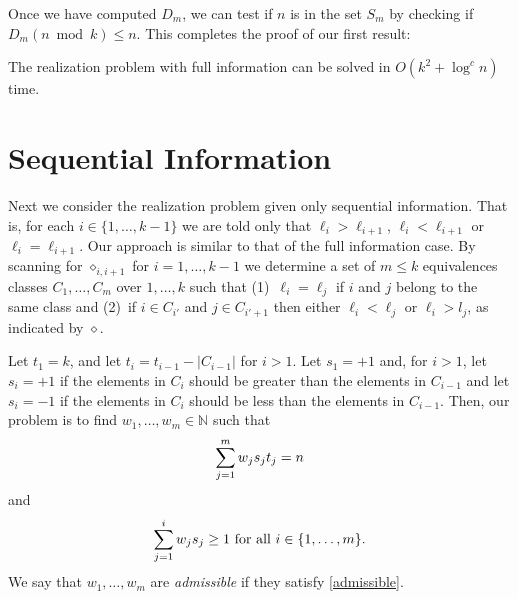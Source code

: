 \documentclass[11pt]{patmorin}
\newcommand{\N}{\mathbb{N}}
\newcommand{\op}{\diamond}
\begin{document}
Once we have computed $D_{m}$, we can test if $n$ is in the set $S_m$ by
checking if $D_m(n\bmod k) \le n$.  This completes the proof of our
first result:

\begin{thm}
The realization problem with full information can be solved in
$O(k^2+\log^c n)$ time.
\end{thm}



\section{Sequential Information}

Next we consider the realization problem given only sequential
information.  That is, for each $i\in\{1,\ldots,k-1\}$ we are told
only that $\ell_i > \ell_{i+1}$, $\ell_i < \ell_{i+1}$ or
$\ell_i=\ell_{i+1}$.  Our approach is similar to that of the full
information case.  By scanning for $\op_{i,i+1}$ for $i=1,\ldots,k-1$
we determine a set of $m\le k$ equivalences classes $C_1,\ldots,C_m$
over $1,\ldots,k$ such that (1)~$\ell_i=\ell_j$ if $i$ and $j$ belong to the
same class and (2)~if $i\in C_{i'}$ and $j\in C_{i'+1}$ then either
$\ell_i<\ell_j$ or $\ell_i > l_j$, as indicated by $\op$. 

Let $t_1=k$, and let $t_i = t_{i-1}-|C_{i-1}|$ for $i>1$.  Let
$s_1=+1$ and, for $i>1$, let $s_i=+1$ if the elements in $C_{i}$
should be greater than the elements in $C_{i-1}$ and let $s_{i}=-1$ if
the elements in $C_{i}$ should be less than the elements in $C_{i-1}$.
Then, our problem is to find $w_1,\ldots,w_m\in\N$ such
that
\begin{equation}
\sum_{j=1}^m w_js_jt_j = n \eqlabel{sum-n}
\end{equation}
and
\begin{equation}
\sum_{j=1}^i w_js_j \ge 1 \mbox{ for all $i\in\{1,\ldots,m\}$.}
\eqlabel{admissible}
\end{equation}
We say that $w_1,\ldots,w_m$ are \emph{admissible} if they satisfy
\eqref{admissible}.
\end{document}
